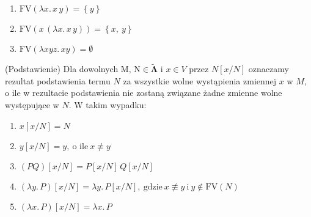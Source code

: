\begin{przyklad}
  \begin{enumerate}[label=(\alph*)]
    \setlength\itemsep{0em}
    \item \(\mathrm{FV}(\lambda x.\,x\,y)=\left\{y\right\}\)
    \item \(\mathrm{FV}(x\,(\lambda x.\, x\,y)) = \left\{x,\ y\right\}\)
    \item \(\mathrm{FV}(\lambda x y z.\, x y) = \emptyset\)
  \end{enumerate}
\end{przyklad}


\begin{definicja}(Podstawienie)\label{def:substitution}
  Dla dowolnych \(\mathrm{M,\,N}\in\mathbf{\tilde\Lambda}\) i \(x\in V\) przez \(N[x/N]\) oznaczamy rezultat podstawienia termu \(N\) za wszystkie wolne wystąpienia zmiennej \(x\) w \(M\), o ile w rezultacie podstawienia nie zostaną związane żadne zmienne wolne występujące w \(N\). W takim wypadku:
  \begin{enumerate}[label={(S\arabic*)}, ref={(S\arabic*)}]
    \setlength\itemsep{0em}
    \item \(x[x/N] = N\)
    \item \(y[x/N] = y,\ \text{o ile}\ x\not\equiv y\)
    \item \((PQ)[x/N] = P[x/N]\,Q[x/N]\)\label{def:substitution_c}
    \item \((\lambda y.\, P)[x/N] = \lambda y.\,P[x/N],\ \text{gdzie}\ x\not\equiv y\ \text{i}\ y\not\in \mathrm{FV}(N)\)
    \item \((\lambda x.\, P)[x/N] = \lambda x.\,P\)\label{def:substitution_e}
  \end{enumerate}
\end{definicja}

